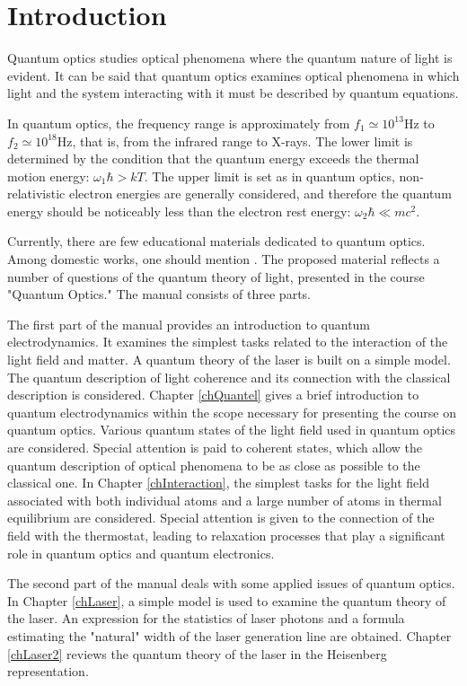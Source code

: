 \chapter*{Introduction}

Quantum optics studies optical phenomena where the quantum nature of light is evident. It can be said that quantum optics examines optical phenomena in which light and the system interacting with it must be described by quantum equations.

In quantum optics, the frequency range is approximately from 
\(f_1 \simeq 10^{13} \text{Hz}\) to \(f_2 \simeq 10^{18} \text{Hz}\), that is, from the infrared range to X-rays. The lower limit is determined by the condition that the quantum energy exceeds the thermal motion energy: 
\(\omega_1 \hbar > k T\). The upper limit is set as in quantum optics, non-relativistic electron energies are generally considered, and therefore the quantum energy should be noticeably less than the electron rest energy: \(\omega_2 \hbar \ll m c^2\).

Currently, there are few educational materials dedicated to quantum optics. Among domestic works, one should mention \cite{bTarasovQuantumOpticsIntro2008}. The proposed material reflects a number of questions of the quantum theory of light, presented in the course "Quantum Optics." The manual consists of three parts.

The first part of the manual provides an introduction to quantum electrodynamics. It examines the simplest tasks related to the interaction of the light field and matter. A quantum theory of the laser is built on a simple model. The quantum description of light coherence and its connection with the classical description is considered. Chapter \ref{chQuantel} gives a brief introduction to quantum electrodynamics within the scope necessary for presenting the course on quantum optics. Various quantum states of the light field used in quantum optics are considered. Special attention is paid to coherent states, which allow the quantum description of optical phenomena to be as close as possible to the classical one. In Chapter \ref{chInteraction}, the simplest tasks for the light field associated with both individual atoms and a large number of atoms in thermal equilibrium are considered. Special attention is given to the connection of the field with the thermostat, leading to relaxation processes that play a significant role in quantum optics and quantum electronics.

The second part of the manual deals with some applied issues of quantum optics. In Chapter \ref{chLaser}, a simple model is used to examine the quantum theory of the laser. An expression for the statistics of laser photons and a formula estimating the "natural" width of the laser generation line are obtained. Chapter \ref{chLaser2} reviews the quantum theory of the laser in the Heisenberg representation.

